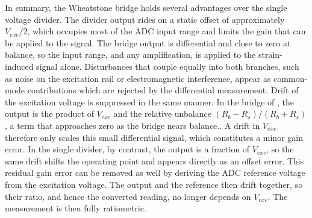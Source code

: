 In summary, the Wheatstone bridge holds several advantages over the single voltage divider. The divider output rides on a static offset of approximately $V_{exc}/2$, which occupies most of the ADC input range and limits the gain that can be applied to the signal. The bridge output is differential and close to zero at balance, so the input range, and any amplification, is applied to the strain-induced signal alone.
Disturbances that couple equally into both branches, such as noise on the excitation rail or electromagnetic interference, appear as common-mode contributions which are rejected by the differential measurement.
Drift of the excitation voltage is suppressed in the same manner. In the bridge of , the output is the product of $V_{exc}$ and the relative unbalance $\left(R_b-R_s\right)/\left(R_b+R_s\right)$, a term that approaches zero as the bridge nears balance.. A drift in $V_{exc}$ therefore only scales this small differential signal, which constitutes a minor gain error. In the single divider, by contrast, the output is a fraction of $V_{exc}$, so the same drift shifts the operating point and appears directly as an offset error.
This residual gain error can be removed as well by deriving the ADC reference voltage from the excitation voltage. The output and the reference then drift together, so their ratio, and hence the converted reading, no longer depends on $V_{exc}$. The measurement is then fully ratiometric.